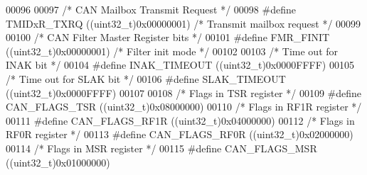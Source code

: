 \begin{DoxyCode}
00096 
00097 \textcolor{comment}{/* CAN Mailbox Transmit Request */}
00098 \textcolor{preprocessor}{#}\textcolor{preprocessor}{define} \textcolor{preprocessor}{TMIDxR\_TXRQ}       \textcolor{preprocessor}{(}\textcolor{preprocessor}{(}\textcolor{preprocessor}{uint32\_t}\textcolor{preprocessor}{)}0x00000001\textcolor{preprocessor}{)} \textcolor{comment}{/* Transmit mailbox request */}
00099 
00100 \textcolor{comment}{/* CAN Filter Master Register bits */}
00101 \textcolor{preprocessor}{#}\textcolor{preprocessor}{define} \textcolor{preprocessor}{FMR\_FINIT}         \textcolor{preprocessor}{(}\textcolor{preprocessor}{(}\textcolor{preprocessor}{uint32\_t}\textcolor{preprocessor}{)}0x00000001\textcolor{preprocessor}{)} \textcolor{comment}{/* Filter init mode */}
00102 
00103 \textcolor{comment}{/* Time out for INAK bit */}
00104 \textcolor{preprocessor}{#}\textcolor{preprocessor}{define} \textcolor{preprocessor}{INAK\_TIMEOUT}      \textcolor{preprocessor}{(}\textcolor{preprocessor}{(}\textcolor{preprocessor}{uint32\_t}\textcolor{preprocessor}{)}0x0000FFFF\textcolor{preprocessor}{)}
00105 \textcolor{comment}{/* Time out for SLAK bit */}
00106 \textcolor{preprocessor}{#}\textcolor{preprocessor}{define} \textcolor{preprocessor}{SLAK\_TIMEOUT}      \textcolor{preprocessor}{(}\textcolor{preprocessor}{(}\textcolor{preprocessor}{uint32\_t}\textcolor{preprocessor}{)}0x0000FFFF\textcolor{preprocessor}{)}
00107 
00108 \textcolor{comment}{/* Flags in TSR register */}
00109 \textcolor{preprocessor}{#}\textcolor{preprocessor}{define} \textcolor{preprocessor}{CAN\_FLAGS\_TSR}     \textcolor{preprocessor}{(}\textcolor{preprocessor}{(}\textcolor{preprocessor}{uint32\_t}\textcolor{preprocessor}{)}0x08000000\textcolor{preprocessor}{)}
00110 \textcolor{comment}{/* Flags in RF1R register */}
00111 \textcolor{preprocessor}{#}\textcolor{preprocessor}{define} \textcolor{preprocessor}{CAN\_FLAGS\_RF1R}    \textcolor{preprocessor}{(}\textcolor{preprocessor}{(}\textcolor{preprocessor}{uint32\_t}\textcolor{preprocessor}{)}0x04000000\textcolor{preprocessor}{)}
00112 \textcolor{comment}{/* Flags in RF0R register */}
00113 \textcolor{preprocessor}{#}\textcolor{preprocessor}{define} \textcolor{preprocessor}{CAN\_FLAGS\_RF0R}    \textcolor{preprocessor}{(}\textcolor{preprocessor}{(}\textcolor{preprocessor}{uint32\_t}\textcolor{preprocessor}{)}0x02000000\textcolor{preprocessor}{)}
00114 \textcolor{comment}{/* Flags in MSR register */}
00115 \textcolor{preprocessor}{#}\textcolor{preprocessor}{define} \textcolor{preprocessor}{CAN\_FLAGS\_MSR}     \textcolor{preprocessor}{(}\textcolor{preprocessor}{(}\textcolor{preprocessor}{uint32\_t}\textcolor{preprocessor}{)}0x01000000\textcolor{preprocessor}{)}

\end{DoxyCode}
